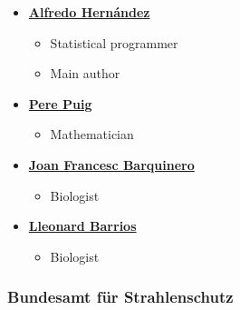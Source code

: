 \documentclass[]{scrartcl}
\providecommand{\tightlist}{%
  \setlength{\itemsep}{0pt}\setlength{\parskip}{0pt}}
\begin{document}
\begin{itemize}
\tightlist
\item
  \textbf{\href{http://aldomann.com}{Alfredo Hernández}}

  \begin{itemize}
  \tightlist
  \item
    Statistical programmer
  \item
    Main author
  \end{itemize}
\item
  \textbf{\href{http://grupsderecerca.uab.cat/advancedstochasticmodelling/content/pere-puig}{Pere Puig}}

  \begin{itemize}
  \tightlist
  \item
    Mathematician
  \end{itemize}
\item
  \textbf{\href{https://scholar.google.com/citations?user=jMLzrEQAAAAJ}{Joan Francesc Barquinero}}

  \begin{itemize}
  \tightlist
  \item
    Biologist
  \end{itemize}
\item
  \textbf{\href{https://www.researchgate.net/scientific-contributions/2058388356_Lleonard_Barrios}{Lleonard Barrios}}

  \begin{itemize}
  \tightlist
  \item
    Biologist
  \end{itemize}
\end{itemize}

\hypertarget{bundesamt-fur-strahlenschutz}{%
\subsubsection*{Bundesamt für Strahlenschutz}\label{bundesamt-fur-strahlenschutz}}
\end{document}
